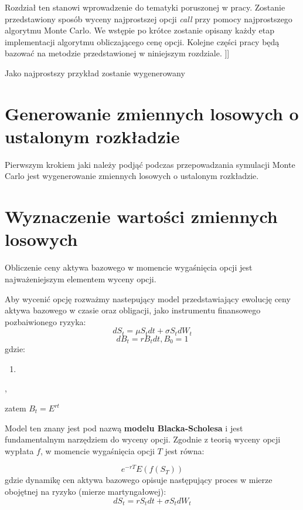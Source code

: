 \documentclass{pracamgr}
\begin{document}
Rozdział ten stanowi wprowadzenie do tematyki poruszonej w pracy. 
Zostanie przedstawiony sposób wyceny najprostszej opcji \textit{call} przy pomocy najprostszego 
algorytmu Monte Carlo. We wstępie po krótce zostanie opisany każdy etap implementacji algorytmu
obliczającego cenę opcji. 
Kolejne części pracy będą bazować na metodzie przedstawionej w niniejszym rozdziale. ]]

Jako najprostszy przykład zostanie wygenerowany

\section{Generowanie zmiennych losowych o ustalonym rozkładzie}

Pierwszym krokiem jaki należy podjąć podczas przepowadzania symulacji Monte Carlo jest 
wygenerowanie zmiennych losowych o ustalonym rozkładzie. 

\section{Wyznaczenie wartości zmiennych losowych}

Obliczenie ceny aktywa bazowego w momencie wygaśnięcia opcji jest najważeniejszym elementem 
wyceny opcji. 

Aby wycenić opcję rozważmy nastepujący model przedstawiający ewolucję ceny aktywa
bazowego w czasie oraz obligacji, jako instrumentu finansowego pozbaiwionego ryzyka:
\begin{equation}
  dS_t = \mu S_t dt + \sigma S_t d W_t 
\end{equation}
\begin{equation}
  dB_t = r B_t dt, B_0 = 1
\end{equation}
gdzie:
\begin{enumerate}
  \item 
\end{enumerate}, 

zatem $B_t = E^{rt}$

Model ten znany jest pod nazwą \textbf{modelu Blacka-Scholesa} i jest fundamentalnym narzędziem do wyceny opcji.
Zgodnie z teorią wyceny opcji wypłata $f$, w momencie wygaśnięcia opcji $T$ jest równa:

\begin{equation}
  e^{-rT} E(f(S_T))
\end{equation}
gdzie dynamikę cen aktywa bazowego opisuje następujący proces w mierze obojętnej na ryzyko (mierze martyngałowej):
\begin{equation}
  dS_t = r S_t dt + \sigma S_t d W_t 
\end{equation}
\end{document}
